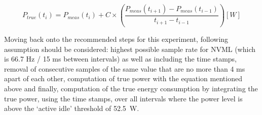 \begin{equation} \label{eq:Computing the true instant power}
    P_{true} (t_i) = P_{meas} (t_i) + C \times (\frac{P_{meas} (t_{i+1}) - P_{meas} (t_{i-1})}{t_{i+1} - t_{i-1}})  [W]
\end{equation}

Moving back onto the recommended steps for this experiment,
following assumption should be considered: highest possible sample
rate for NVML (which is 66.7 Hz / 15 ms between intervals) as well
as including the time stamps, removal of consecutive samples of
the same value that are no more than 4 ms apart of each other,
computation of true power with the equation mentioned above and
finally, computation of the true energy consumption by integrating
the true power, using the time stamps, over all intervals where
the power level is above the `active idle' threshold of 52.5~W.

